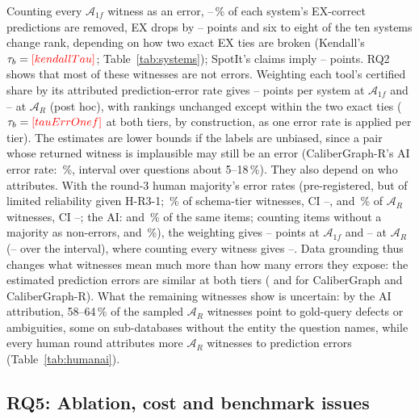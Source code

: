 Counting every $\mathcal A_{1f}$ witness as an error, --\,\% of each system's EX-correct predictions are removed, EX drops by -- points and six to eight of the ten systems change rank, depending on how two exact EX ties are broken (Kendall's $\tau_b=\V{kendallTau}$; Table~\ref{tab:systems}); SpotIt's claims imply -- points. RQ2 shows that most of these witnesses are not errors. Weighting each tool's certified share by its attributed prediction-error rate gives -- points per system at $\mathcal A_{1f}$ and -- at $\mathcal A_R$ (post hoc), with rankings unchanged except within the two exact ties ($\tau_b=\V{tauErrOnef}$ at both tiers, by construction, as one error rate is applied per tier). The estimates are lower bounds if the labels are unbiased, since a pair whose returned witness is implausible may still be an error (CaliberGraph-R's AI error rate: \,\%, interval over questions about 5--18\,\%). They also depend on who attributes. With the round-3 human majority's error rates (pre-registered, but of limited reliability given H-R3-1; \,\% of schema-tier witnesses, CI --, and \,\% of $\mathcal A_R$ witnesses, CI --; the AI:  and \,\% of the same items; counting items without a majority as non-errors,  and \,\%), the weighting gives -- points at $\mathcal A_{1f}$ and -- at $\mathcal A_R$ (-- over the interval), where counting every witness gives --. Data grounding thus changes what witnesses mean much more than how many errors they expose: the estimated prediction errors are similar at both tiers ( and  for CaliberGraph and CaliberGraph-R). What the remaining witnesses show is uncertain: by the AI attribution, 58--64\,\% of the sampled $\mathcal A_R$ witnesses point to gold-query defects or ambiguities, some on sub-databases without the entity the question names, while every human round attributes more $\mathcal A_R$ witnesses to prediction errors (Table~\ref{tab:humanai}).


\subsection{RQ5: Ablation, cost and benchmark issues}\label{sec:ablation}

